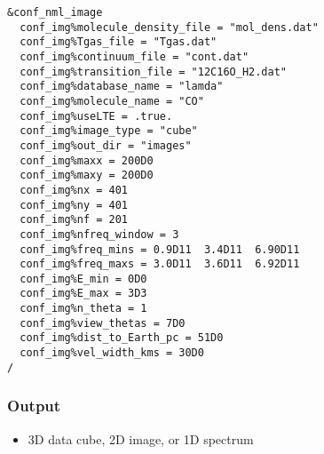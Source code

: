 \documentclass{article}
\begin{document}
\begin{lstlisting}
&conf_nml_image
  conf_img%molecule_density_file = "mol_dens.dat"
  conf_img%Tgas_file = "Tgas.dat"
  conf_img%continuum_file = "cont.dat"
  conf_img%transition_file = "12C16O_H2.dat"
  conf_img%database_name = "lamda"
  conf_img%molecule_name = "CO"
  conf_img%useLTE = .true.
  conf_img%image_type = "cube"
  conf_img%out_dir = "images"
  conf_img%maxx = 200D0
  conf_img%maxy = 200D0
  conf_img%nx = 401
  conf_img%ny = 401
  conf_img%nf = 201
  conf_img%nfreq_window = 3
  conf_img%freq_mins = 0.9D11  3.4D11  6.90D11
  conf_img%freq_maxs = 3.0D11  3.6D11  6.92D11
  conf_img%E_min = 0D0
  conf_img%E_max = 3D3
  conf_img%n_theta = 1
  conf_img%view_thetas = 7D0
  conf_img%dist_to_Earth_pc = 51D0
  conf_img%vel_width_kms = 30D0
/
\end{lstlisting}

\subsubsection{Output}

\begin{itemize}
  \item 3D data cube, 2D image, or 1D spectrum
\end{itemize}  

\end{document}

